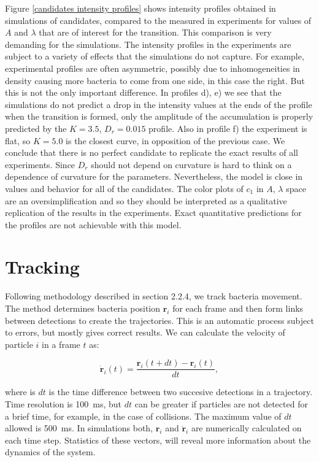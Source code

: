 Figure \ref{candidates intensity profiles} shows intensity profiles obtained in simulations of candidates, compared to the measured in experiments for values of $A$ and $\lambda$ that are of interest for the transition. This comparison is very demanding for the simulations. The intensity profiles in the experiments are subject to a variety of effects that the simulations do not capture. For example, experimental profiles are often asymmetric, possibly due to inhomogeneities in density causing more bacteria to come from one side, in this case the right. But this is not the only important difference. In profiles d), e) we see that the simulations do not predict a drop in the intensity values at the ends of the profile when the transition is formed, only the amplitude of the accumulation is properly predicted by the $K=3.5$, $D_r=0.015$ profile. Also in profile f) the experiment is flat, so $K=5.0$ is the closest curve, in opposition of the previous case. We conclude that there is no perfect candidate to replicate the exact results of all experiments. Since $D_r$ should not depend on curvature is hard to think on a dependence of curvature for the parameters. Nevertheless, the model is close in values and behavior for all of the candidates. The color plots of $c_1$ in $A$, $\lambda$ space are an oversimplification and so they should be interpreted as a qualitative replication of the results in the experiments. Exact quantitative predictions for the profiles are not achievable with this model.

\section{Tracking}

Following methodology described in section 2.2.4, we track bacteria movement. The method determines bacteria position $\textbf{r}_i$ for each frame and then form links between detections to create the trajectories. This is an automatic process subject to errors, but mostly gives correct results. We can calculate the velocity of particle $i$ in a frame $t$ as:

\begin{equation}
    \dot{\textbf{r}}_i(t) =  \frac{\textbf{r}_i(t+dt)-\textbf{r}_i(t)}{dt},
\end{equation}

where is $dt$ is the time difference between two succesive detections in a trajectory. Time resolution is \SI{100}{\milli\second}, but $dt$ can be greater if particles are not detected for a brief time, for example, in the case of collisions. The maximum value of $dt$ allowed is \SI{500}{\milli\second}. In simulations both, $\textbf{r}_i$ and $\dot{\textbf{r}}_i$ are numerically calculated on each time step. Statistics of these vectors, will reveal more information about the dynamics of the system.

